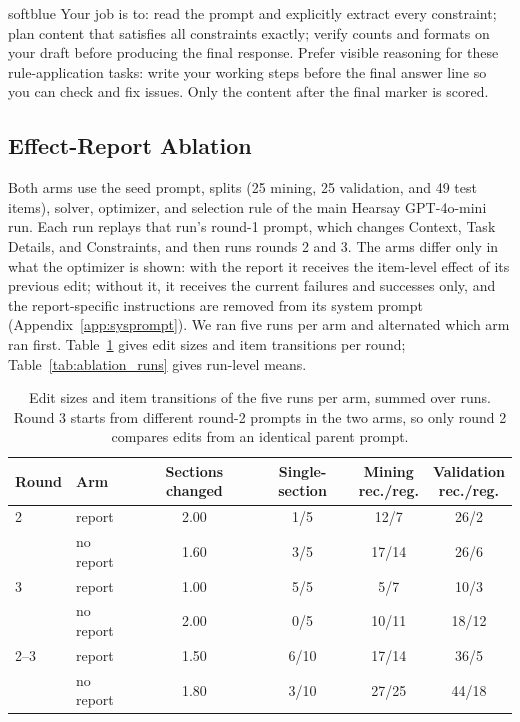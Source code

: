 \documentclass[11pt]{article}
\begin{document}
\begin{promptbox}[title={\textbf{IFBench: returned Task Details} (round 1 excerpt)},fontupper=\small]{softblue}
Your job is to: read the prompt and explicitly extract every constraint; plan content that satisfies all constraints
exactly; verify counts and formats on your draft before producing the final response. Prefer visible reasoning for these rule-application
tasks: write your working steps before the final answer line so you can check and fix issues. Only the content after the final marker is
scored.
\end{promptbox}

\FloatBarrier
\subsection{Effect-Report Ablation}
\label{app:ablation}
Both arms use the seed prompt, splits (25 mining, 25 validation, and 49 test items), solver, optimizer, and selection
rule of the main Hearsay GPT-4o-mini run. Each run replays that run's round-1 prompt, which changes Context, Task
Details, and Constraints, and then runs rounds 2 and 3. The arms differ only in what the optimizer is shown: with the
report it receives the item-level effect of its previous edit; without it, it receives the current failures and
successes only, and the report-specific instructions are removed from its system prompt (Appendix~\ref{app:sysprompt}).
We ran five runs per arm and alternated which arm ran first. Table~\ref{tab:ablation_rounds} gives edit sizes and item
transitions per round; Table~\ref{tab:ablation_runs} gives run-level means.

\begin{table}[htbp]
\centering
\small
\setlength{\tabcolsep}{3.5pt}
\begin{tabular}{llcccc}
\toprule
\rowcolor{midblue}Round & Arm & Sections changed & Single-section & \shortstack{Mining\\rec./reg.} & \shortstack{Validation\\rec./reg.} \\
\midrule
2 & report & 2.00 & 1/5 & 12/7 & 26/2 \\
 & no report & 1.60 & 3/5 & 17/14 & 26/6 \\
\midrule
3 & report & 1.00 & 5/5 & 5/7 & 10/3 \\
 & no report & 2.00 & 0/5 & 10/11 & 18/12 \\
\midrule
2--3 & report & 1.50 & 6/10 & 17/14 & 36/5 \\
 & no report & 1.80 & 3/10 & 27/25 & 44/18 \\
\bottomrule
\end{tabular}
\caption{Edit sizes and item transitions of the five runs per arm, summed over runs. Round 3 starts from different
round-2 prompts in the two arms, so only round 2 compares edits from an identical parent prompt.}
\label{tab:ablation_rounds}
\end{table}
\end{document}
